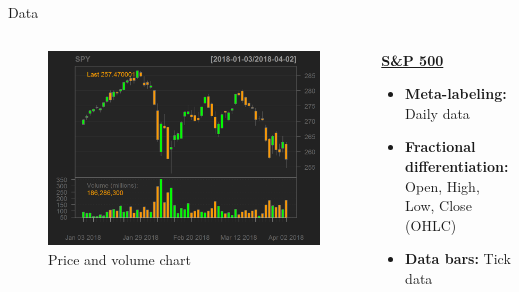 \documentclass[usenames,dvipsnames]{beamer} %
\begin{document}
\begin{frame}{Data}
\begin{columns}
\begin{column}{.7\textwidth}
\begin{figure}
	\includegraphics[width=\textwidth]{img/SPYPriceVolume}
	\caption{Price and volume chart}		
\end{figure}
\end{column}

\begin{column}{.3\textwidth}
\begin{center}
	\textbf{\underline{S\&P 500}}
\end{center}
\vspace{-.2cm}
\begin{itemize}
	\item \textbf{Meta-labeling:} 
	\newline Daily data
	
	\vspace{.15cm}
	\item \textbf{Fractional differentiation:} 
	\newline Open, High, Low, Close (OHLC)
	
	\vspace{.15cm}
	\item \textbf{Data bars:} \newline Tick data
\end{itemize}
\end{column}
\end{columns}
\end{frame}
\end{document}
